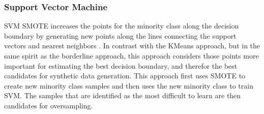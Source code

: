 \documentclass[letterpaper]{article}
\begin{document}
{\subsubsection{Support Vector Machine}
SVM SMOTE increases the points for the minority class along the decision boundary by generating new points along the lines connecting the support vectors and nearest neighbors \cite{Nguyen2011-cb}. In contrast with the KMeans approach, but in the same spirit as the borderline approach, this approach considers those points more important for estimating the best decision boundary, and therefor the best candidates for synthetic data generation. This approach first uses SMOTE to create new minority class samples and then uses the new minority class to train SVM. The samples that are identified as the most difficult to learn are then candidates for oversampling.

}
\end{document}
